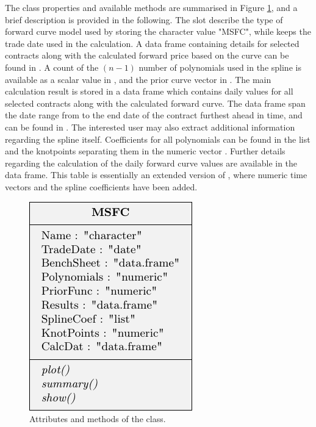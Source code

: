 The  class properties and available methods are summarised in Figure \ref{fig:msfc_class}, and a brief description is provided in the following. The  slot describe the type of forward curve model used by storing the character value "MSFC", while  keeps the trade date used in the calculation. A data frame containing details for selected contracts along with the calculated forward price based on the curve can be found in . A count of the $(n-1)$ number of polynomials used in the spline is available as a scalar value in , and the prior curve vector in . The main calculation result is stored in a data frame which contains daily values for all selected contracts along with the calculated forward curve. The data frame span the date range from  to the end date of the contract furthest ahead in time, and can be found in . The interested user may also extract additional information regarding the spline itself. Coefficients for all polynomials can be found in the  list and the knotpoints separating them in the numeric vector . Further details regarding the calculation of the daily forward curve values are available in the  data frame. This table is essentially an extended version of , where numeric time vectors and the spline coefficients have been added.

\begin{figure}[h!]
\centering
\includegraphics [scale = 0.9] {msfc_class.pdf}
\caption{Attributes and methods of the  class.}
\label{fig:msfc_class}
\end{figure}

